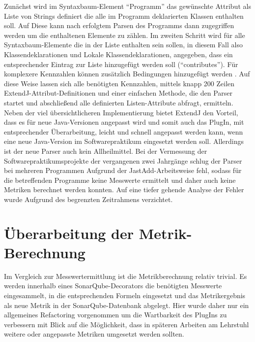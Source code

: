 \documentclass[da,ngerman]{stthesis}
\begin{document}
			Zunächst wird im Syntaxbaum-Element "`Programm"' das gewünschte Attribut als Liste von Strings definiert die alle im Programm deklarierten Klassen enthalten soll. Auf Diese kann nach erfolgtem Parsen des Programms dann zugegriffen werden um die enthaltenen Elemente zu zählen. Im zweiten Schritt wird für alle Syntaxbaum-Elemente die in der Liste enthalten sein sollen, in diesem Fall also Klassendeklarationen und Lokale Klassendeklarationen, angegeben, dass ein entsprechender Eintrag zur Liste hinzugefügt werden soll ("`contributes"'). Für komplexere Kennzahlen können zusätzlich Bedingungen hinzugefügt werden \cite{ExtendJTutorial}. \newline
			Auf diese Weise lassen sich alle benötigten Kennzahlen, mittels knapp 200 Zeilen ExtendJ-Attribut-Definitionen und einer einfachen Methode, die den Parser startet und abschließend alle definierten Listen-Attribute abfragt, ermitteln. Neben der viel übersichtlicheren Implementierung bietet ExtendJ den Vorteil, dass es für neue Java-Versionen angepasst wird und somit auch das PlugIn, mit entsprechender Überarbeitung, leicht und schnell angepasst werden kann, wenn eine neue Java-Version im Softwarepraktikum eingesetzt werden soll. \newline
			Allerdings ist der neue Parser auch kein Allheilmittel. Bei der Vermessung der Softwarepraktikumsprojekte der vergangenen zwei Jahrgänge schlug der Parser bei mehreren Programmen Aufgrund der JastAdd-Arbeitsweise fehl, sodass für die betreffenden Programme keine Messwerte ermittelt und daher auch keine Metriken berechnet werden konnten. Auf eine tiefer gehende Analyse der Fehler wurde Aufgrund des begrenzten Zeitrahmens verzichtet.
		\section{Überarbeitung der Metrik-Berechnung}
			Im Vergleich zur Messwertermittlung ist die Metrikberechnung relativ trivial. Es werden innerhalb eines SonarQube-Decorators die benötigten Messwerte eingesammelt, in die entsprechenden Formeln eingesetzt und das Metrikergebnis als neue Metrik in der SonarQube-Datenbank abgelegt. Hier wurde daher nur ein allgemeines Refactoring vorgenommen um die Wartbarkeit des PlugIns zu verbessern mit Blick auf die Möglichkeit, dass in späteren Arbeiten am Lehrstuhl weitere oder angepasste Metriken umgesetzt werden sollten.
\end{document}
